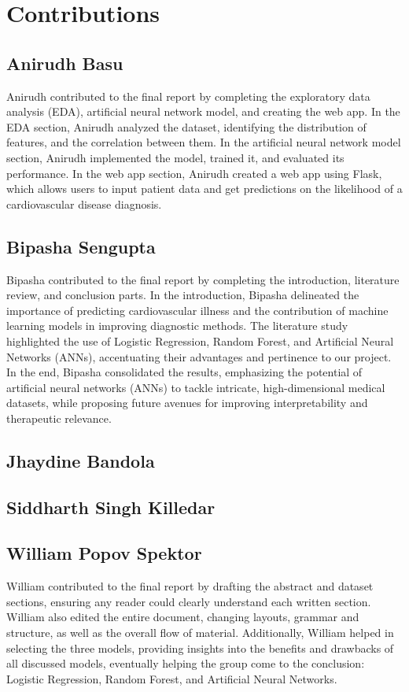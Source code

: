 \section{Contributions}

\subsection{Anirudh Basu}

Anirudh contributed to the final report by completing the exploratory data analysis (EDA), artificial neural network model, and creating the web app. In the EDA section, Anirudh analyzed the dataset, identifying the distribution of features, and the correlation between them. In the artificial neural network model section, Anirudh implemented the model, trained it, and evaluated its performance. In the web app section, Anirudh created a web app using Flask, which allows users to input patient data and get predictions on the likelihood of a cardiovascular disease diagnosis.

\subsection{Bipasha Sengupta}
Bipasha contributed to the final report by completing the introduction, literature review, and conclusion parts. In the introduction, Bipasha delineated the importance of predicting cardiovascular illness and the contribution of machine learning models in improving diagnostic methods. The literature study highlighted the use of Logistic Regression, Random Forest, and Artificial Neural Networks (ANNs), accentuating their advantages and pertinence to our project. In the end, Bipasha consolidated the results, emphasizing the potential of artificial neural networks (ANNs) to tackle intricate, high-dimensional medical datasets, while proposing future avenues for improving interpretability and therapeutic relevance.

\subsection{Jhaydine Bandola}

\subsection{Siddharth Singh Killedar}

\subsection{William Popov Spektor}
William contributed to the final report by drafting the abstract and dataset sections, ensuring any reader could clearly understand each written section. William also edited the entire document, changing layouts, grammar and structure, as well as the overall flow of material. Additionally, William helped in selecting the three models, providing insights into the benefits and drawbacks of all discussed models, eventually helping the group come to the conclusion: Logistic Regression, Random Forest, and Artificial Neural Networks.